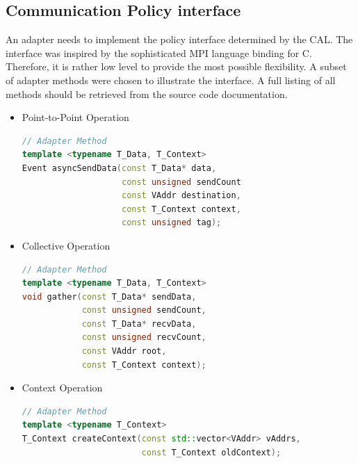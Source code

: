 \subsection{Communication Policy interface}
\label{sec:impl:policy_interface}
An adapter needs to implement the policy interface
determined by the CAL.  The interface was inspired by the
sophisticated MPI language binding for C. Therefore, it is rather low
level to provide the most possible flexibility.  A subset of adapter
methods were chosen to illustrate the interface. A full listing of all
methods should be retrieved from the source code documentation.

\begin{itemize}

  \item Point-to-Point Operation
    \begin{lstlisting}[language=C++, breaklines=false, label={}]
// Adapter Method      
template <typename T_Data, T_Context>      
Event asyncSendData(const T_Data* data,      
                    const unsigned sendCount
                    const VAddr destination,
                    const T_Context context,
                    const unsigned tag); 
    \end{lstlisting}
    
  \item Collective Operation
    \begin{lstlisting}[language=C++, breaklines=false, label={}]
// Adapter Method      
template <typename T_Data, T_Context>      
void gather(const T_Data* sendData,
            const unsigned sendCount,
            const T_Data* recvData,
            const unsigned recvCount,
            const VAddr root,
            const T_Context context);
    \end{lstlisting}

  \item Context Operation
    \begin{lstlisting}[language=C++, breaklines=false, label={}]
// Adapter Method
template <typename T_Context>      
T_Context createContext(const std::vector<VAddr> vAddrs,
                        const T_Context oldContext);
    \end{lstlisting}
  
\end{itemize}

